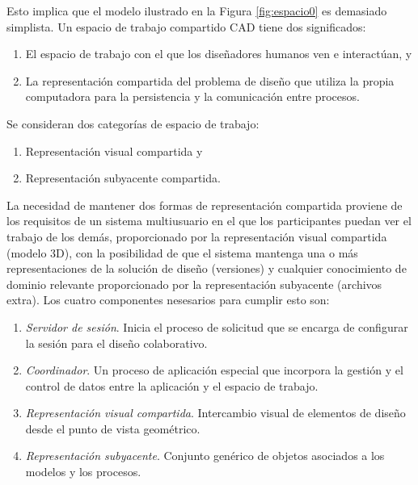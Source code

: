Esto implica que el modelo ilustrado en la Figura \ref{fig:espacio0} es demasiado simplista. Un espacio de trabajo compartido CAD tiene dos significados:
\begin{enumerate}
\item El espacio de trabajo con el que los diseñadores humanos ven e interactúan, y
\item La representación compartida del problema de diseño que utiliza la propia computadora para la persistencia y la comunicación entre procesos.
\end{enumerate}

Se consideran dos categorías de espacio de trabajo:

\begin{enumerate}
    \item Representación visual compartida y
    \item Representación subyacente compartida.
\end{enumerate}
La necesidad de mantener dos formas de representación compartida proviene de los requisitos de un sistema multiusuario en el que los participantes puedan ver el trabajo de los demás, proporcionado por la representación visual compartida (modelo 3D), con la posibilidad de que el sistema mantenga una o más representaciones de la solución de diseño (versiones) y cualquier conocimiento de dominio relevante proporcionado por la representación subyacente (archivos extra). Los cuatro componentes nesesarios para cumplir esto son:

\begin{enumerate}
    \item \textit{Servidor de sesión}. Inicia el proceso de solicitud que se encarga de configurar la sesión para el diseño colaborativo.
    \item \textit{Coordinador}. Un proceso de aplicación especial que incorpora la gestión y el control de datos entre la aplicación y el espacio de trabajo.
    \item \textit{Representación visual compartida}. Intercambio visual de elementos de diseño desde el punto de vista geométrico.
    \item \textit{Representación subyacente}. Conjunto genérico de objetos asociados a los modelos y los procesos.
\end{enumerate}

